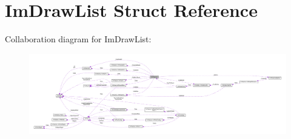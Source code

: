 \hypertarget{structImDrawList}{}\section{Im\+Draw\+List Struct Reference}
\label{structImDrawList}


Collaboration diagram for Im\+Draw\+List\+:\nopagebreak
\begin{figure}[H]
\begin{center}
\leavevmode
\includegraphics[width=350pt]{structImDrawList__coll__graph}
\end{center}
\end{figure}
